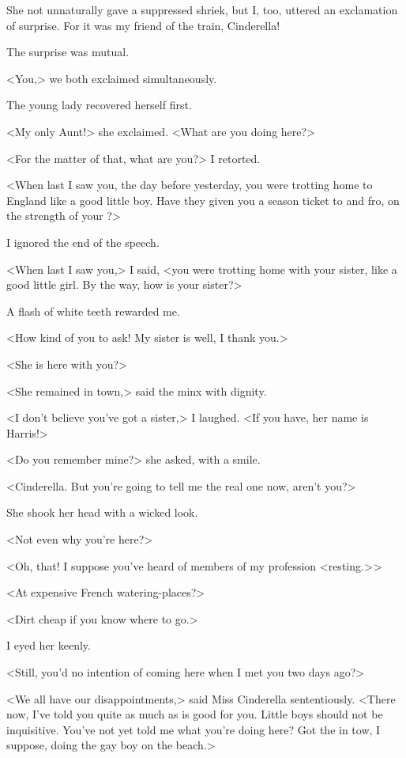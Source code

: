  She not unnaturally gave a suppressed shriek, but I, too, uttered an exclamation of surprise. For it was my friend of the train, Cinderella! 

 The surprise was mutual. 

 <You,> we both exclaimed simultaneously. 

 The young lady recovered herself first. 

 <My only Aunt!> she exclaimed. <What are you doing here?> 

 <For the matter of that, what are you?> I retorted. 

 <When last I saw you, the day before yesterday, you were trotting home to England like a good little boy. Have they given you a season ticket to and fro, on the strength of your ?> 

 I ignored the end of the speech. 

 <When last I saw you,> I said, <you were trotting home with your sister, like a good little girl. By the way, how is your sister?> 

 A flash of white teeth rewarded me. 

 <How kind of you to ask! My sister is well, I thank you.> 

 <She is here with you?> 

 <She remained in town,> said the minx with dignity. 

 <I don't believe you've got a sister,> I laughed. <If you have, her name is Harris!> 

 <Do you remember mine?> she asked, with a smile. 

 <Cinderella. But you're going to tell me the real one now, aren't you?> 

 She shook her head with a wicked look. 

 <Not even why you're here?> 

 <Oh, that! I suppose you've heard of members of my profession <resting.> > 

 <At expensive French watering-places?> 

 <Dirt cheap if you know where to go.> 

 I eyed her keenly. 

 <Still, you'd no intention of coming here when I met you two days ago?> 

 <We all have our disappointments,> said Miss Cinderella sententiously. <There now, I've told you quite as much as is good for you. Little boys should not be inquisitive. You've not yet told me what you're doing here? Got the  in tow, I suppose, doing the gay boy on the beach.> 

